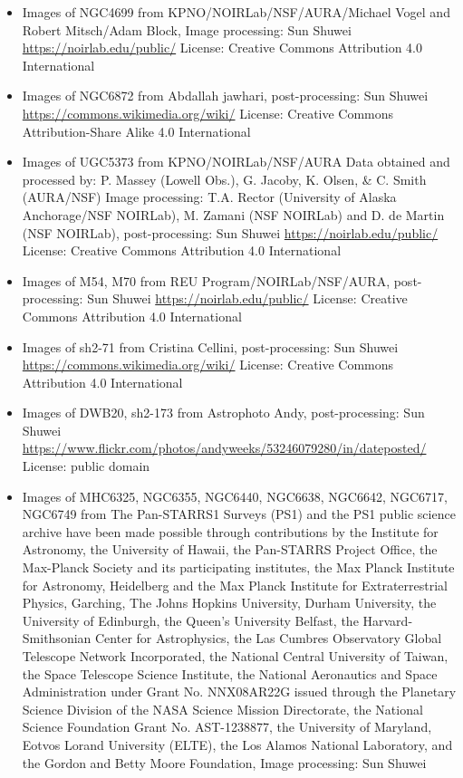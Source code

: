 \begin{itemize}
\item Images of NGC4699
	 from KPNO/NOIRLab/NSF/AURA/Michael Vogel and Robert Mitsch/Adam Block, Image processing: Sun Shuwei
	 \url{https://noirlab.edu/public/}
	 License: Creative Commons Attribution 4.0 International
\item Images of NGC6872
	 from Abdallah jawhari, post-processing: Sun Shuwei
	 \url{https://commons.wikimedia.org/wiki/}
	 License: Creative Commons Attribution-Share Alike 4.0 International
\item Images of UGC5373
	 from KPNO/NOIRLab/NSF/AURA Data obtained and processed by: P. Massey (Lowell Obs.), G. Jacoby, K. Olsen, \& C. Smith (AURA/NSF) Image processing: T.A. Rector (University of Alaska Anchorage/NSF NOIRLab), M. Zamani (NSF NOIRLab) and D. de Martin (NSF NOIRLab), post-processing: Sun Shuwei
	 \url{https://noirlab.edu/public/}
	 License: Creative Commons Attribution 4.0 International
\item Images of M54, M70
	 from REU Program/NOIRLab/NSF/AURA, post-processing: Sun Shuwei
	 \url{https://noirlab.edu/public/}
	 License: Creative Commons Attribution 4.0 International
\item Images of sh2-71
	 from Cristina Cellini, post-processing: Sun Shuwei
	 \url{https://commons.wikimedia.org/wiki/}
	 License: Creative Commons Attribution 4.0 International
\item Images of DWB20, sh2-173
	 from Astrophoto Andy, post-processing: Sun Shuwei
	 \url{https://www.flickr.com/photos/andyweeks/53246079280/in/dateposted/}
	 License: public domain
\item Images of MHC6325, NGC6355, NGC6440, NGC6638, NGC6642, NGC6717, NGC6749
	 from The Pan-STARRS1 Surveys (PS1) and the PS1 public science archive have been made possible through contributions by the Institute for Astronomy, the University of Hawaii, the Pan-STARRS Project Office, the Max-Planck Society and its participating institutes, the Max Planck Institute for Astronomy, Heidelberg and the Max Planck Institute for Extraterrestrial Physics, Garching, The Johns Hopkins University, Durham University, the University of Edinburgh, the Queen's University Belfast, the Harvard-Smithsonian Center for Astrophysics, the Las Cumbres Observatory Global Telescope Network Incorporated, the National Central University of Taiwan, the Space Telescope Science Institute, the National Aeronautics and Space Administration under Grant No. NNX08AR22G issued through the Planetary Science Division of the NASA Science Mission Directorate, the National Science Foundation Grant No. AST-1238877, the University of Maryland, Eotvos Lorand University (ELTE), the Los Alamos National Laboratory, and the Gordon and Betty Moore Foundation, Image processing: Sun Shuwei

\end{itemize}
